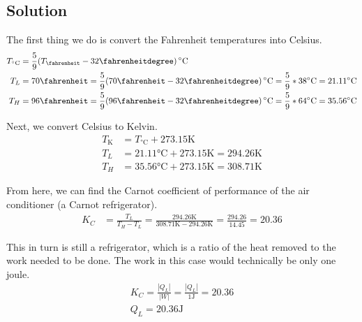 \documentclass[12pt]{article}
\begin{document}
        \subsection{Solution}
            The first thing we do is convert the Fahrenheit temperatures into Celsius.
            \begin{align}
                T_{\unit{\celsius}}  &=  \frac{5}{9}(T_{\unit{\fahrenheit}} - 32\unit{\fahrenheitdegree})\,\unit{\celsius}\\
                T_L &=  70\unit{\fahrenheit}
                    =   \frac{5}{9}(70\unit{\fahrenheit} - 32\unit{\fahrenheitdegree})\,\unit{\celsius}
                    =   \frac{5}{9} * 38\unit{\celsius} 
                    =   21.11\unit{\celsius}\\
                T_H &=  96\unit{\fahrenheit}
                    =   \frac{5}{9}(96\unit{\fahrenheit} - 32\unit{\fahrenheitdegree})\,\unit{\celsius}
                    =   \frac{5}{9} * 64\unit{\celsius}
                    =   35.56\unit{\celsius}
            \end{align}

            Next, we convert Celsius to Kelvin.
            \begin{align}
                T_{\unit{\kelvin}}  &=  T_{\unit{\celsius}} + 273.15\unit{\kelvin}\\
                T_L &=  21.11\unit{\celsius} + 273.15\unit{\kelvin}
                    =   294.26\unit{\kelvin}\\
                T_H &=  35.56\unit{\celsius} + 273.15\unit{\kelvin}
                    =   308.71\unit{\kelvin}
            \end{align}

            From here, we can find the Carnot coefficient of performance of the air conditioner (a Carnot refrigerator).
            \begin{align}
                K_C &=  \frac{T_L}{T_H - T_L}
                    =   \frac{294.26\unit{\kelvin}}{308.71\unit{\kelvin} - 294.26\unit{\kelvin}}
                    =   \frac{294.26}{14.45}
                    =   20.36
            \end{align}

            This in turn is still a refrigerator, which is a ratio of the heat removed to the work needed to be done.
            The work in this case would technically be only one joule.
            \begin{gather}
                K_C =   \frac{|Q_L|}{|W|}
                    =   \frac{|Q_L|}{1\unit{\joule}}
                    =   20.36\\
                Q_L =   \boxed{20.36\unit{\joule}}
            \end{gather}
\end{document}
